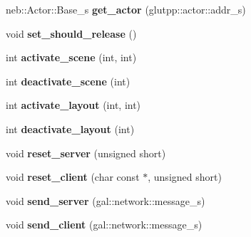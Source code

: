 \begin{DoxyCompactItemize}
\item 
\hypertarget{classneb_1_1app_acd137ce9a84bac35958d05c9d31ce113}{neb\-::\-Actor\-::\-Base\-\_\-s {\bfseries get\-\_\-actor} (glutpp\-::actor\-::addr\-\_\-s)}\label{classneb_1_1app_acd137ce9a84bac35958d05c9d31ce113}

\item 
\hypertarget{classneb_1_1app_a585d3455638323086057befeb4e91a1b}{void {\bfseries set\-\_\-should\-\_\-release} ()}\label{classneb_1_1app_a585d3455638323086057befeb4e91a1b}

\item 
\hypertarget{classneb_1_1app_aa558ff3c281cd6f6b7bdca7f5a7807ff}{int {\bfseries activate\-\_\-scene} (int, int)}\label{classneb_1_1app_aa558ff3c281cd6f6b7bdca7f5a7807ff}

\item 
\hypertarget{classneb_1_1app_a54affa2aa2f29724e15dee3fb4f01b2b}{int {\bfseries deactivate\-\_\-scene} (int)}\label{classneb_1_1app_a54affa2aa2f29724e15dee3fb4f01b2b}

\item 
\hypertarget{classneb_1_1app_a421f2d98f0857f6d73824740019c94f1}{int {\bfseries activate\-\_\-layout} (int, int)}\label{classneb_1_1app_a421f2d98f0857f6d73824740019c94f1}

\item 
\hypertarget{classneb_1_1app_a5b5b9384258da420e426d15f7c0753f3}{int {\bfseries deactivate\-\_\-layout} (int)}\label{classneb_1_1app_a5b5b9384258da420e426d15f7c0753f3}

\item 
\hypertarget{classneb_1_1app_a88525d86c44907e36e534ffb5d8c9f04}{void {\bfseries reset\-\_\-server} (unsigned short)}\label{classneb_1_1app_a88525d86c44907e36e534ffb5d8c9f04}

\item 
\hypertarget{classneb_1_1app_a94908472755f4f20846a75a5368825cb}{void {\bfseries reset\-\_\-client} (char const $\ast$, unsigned short)}\label{classneb_1_1app_a94908472755f4f20846a75a5368825cb}

\item 
\hypertarget{classneb_1_1app_a8250d1d585de859af0ae8098db7ad011}{void {\bfseries send\-\_\-server} (gal\-::network\-::message\-\_\-s)}\label{classneb_1_1app_a8250d1d585de859af0ae8098db7ad011}

\item 
\hypertarget{classneb_1_1app_a197b5f2b57db91d1fe622a9f40c65e15}{void {\bfseries send\-\_\-client} (gal\-::network\-::message\-\_\-s)}\label{classneb_1_1app_a197b5f2b57db91d1fe622a9f40c65e15}


\end{DoxyCompactItemize}
